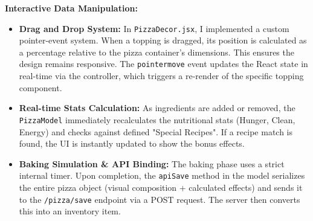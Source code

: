 \documentclass[11pt]{article}
\begin{document}
\textbf{Interactive Data Manipulation:}
\begin{itemize}
    \item \textbf{Drag and Drop System:} 
    In \texttt{PizzaDecor.jsx}, I implemented a custom pointer-event system. When a topping is dragged, its position is calculated as a percentage relative to the pizza container's dimensions. This ensures the design remains responsive. The \texttt{pointermove} event updates the React state in real-time via the controller, which triggers a re-render of the specific topping component.
    
    \item \textbf{Real-time Stats Calculation:}
    As ingredients are added or removed, the \texttt{PizzaModel} immediately recalculates the nutritional stats (Hunger, Clean, Energy) and checks against defined "Special Recipes". If a recipe match is found, the UI is instantly updated to show the bonus effects.
    
    \item \textbf{Baking Simulation \& API Binding:}
    The baking phase uses a strict internal timer. Upon completion, the \texttt{apiSave} method in the model serializes the entire pizza object (visual composition + calculated effects) and sends it to the \texttt{/pizza/save} endpoint via a POST request. The server then converts this into an inventory item.
\end{itemize}
\end{document}
